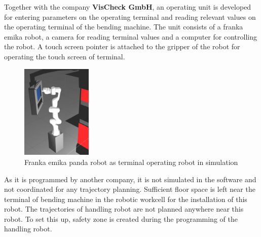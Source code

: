 Together with the company \textbf{VisCheck GmbH}, an operating unit is developed
for entering parameters on the operating terminal and reading relevant values on the operating
terminal of the bending machine. The unit consists of a franka emika robot, a camera for reading terminal values
and a computer for controlling the robot. A touch screen pointer is attached to the gripper of the robot
for operating the touch screen of terminal.

\begin{figure}[h]
    \centering
    \includegraphics[width=0.3\textwidth]{figures/panda-robot-simulation.png}
    \caption{Franka emika panda robot as terminal operating robot in simulation}
    \label{fig:terminal-robot}
\end{figure}

As it is programmed by another company, it is not simulated in the software and not coordinated for any trajectory planning. Sufficient floor space
is left near the terminal of bending machine in the robotic workcell for the installation of this robot.
The trajectories of handling robot are not planned anywhere near this robot. To set this up, safety zone is created
during the programming of the handling robot.
